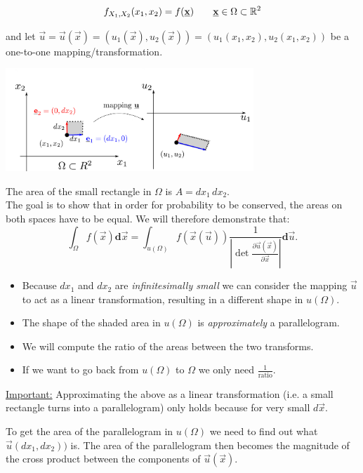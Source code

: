 $$
f_{X_1, X_2}(x_1, x_2) = f(\underline{\mathbf{x}}) \qquad \underline{\mathbf{x}} \in \Omega \subset \mathbb{R}^2
$$

and let $\vec u = \vec u(\vec x) = ( u_1(\vec x), u_2(\vec x)) = ( u_1(x_1, x_2), u_2(x_1, x_2)) $ be a one-to-one mapping/transformation.

\includegraphics[width=0.7\textwidth]{img/u.pdf}

The area of the small rectangle in $\Omega$ is $A = dx_1\, dx_2$.\\

The goal is to show that in order for probability to be conserved, the areas on both spaces have to be equal. 
We will therefore demonstrate that:
$$
\int_{\Omega} f(\vec{x}) \mathbf{d}\vec{x}
=\int_{u(\Omega)} f({\vec x(\vec u)}) \frac{1}{\left|\det \frac{\partial \vec{u}(\vec{x})}{\partial \vec{x}} \right|} \mathbf{d}\vec{u}.
$$

\begin{itemize}
\item Because $dx_1$ and $dx_2$ are \emph{infinitesimally small} we can consider the mapping 
$\vec u$ to act as a linear transformation, resulting in a different shape in $u(\Omega)$. 
\item The shape of the shaded area in $u(\Omega)$ is \emph{approximately} a parallelogram.
\item We will compute the ratio of the areas between the two transforms.
\item If we want to go back from $u(\Omega)$ to $\Omega$ we only need $\frac{1}{\text{ratio}}$.
\end{itemize}

\underline{Important:}
Approximating the above as a linear transformation (i.e. a small rectangle turns into a parallelogram) only holds because for very small $d\vec x$.

To get the area of the parallelogram in $u(\Omega)$ we need to find out what $\vec u(dx_1, dx_2))$ is.
The area of the parallelogram then becomes the magnitude of the cross product between the components of $\vec u(\vec x)$.

